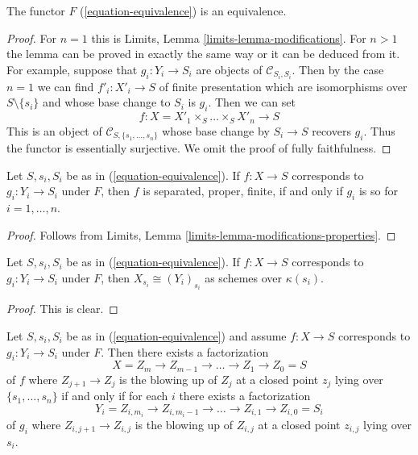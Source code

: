\begin{lemma}
\label{lemma-equivalence}
The functor $F$ (\ref{equation-equivalence}) is an equivalence.
\end{lemma}

\begin{proof}
For $n = 1$ this is Limits, Lemma \ref{limits-lemma-modifications}.
For $n > 1$ the lemma can be proved in exactly the same way or it
can be deduced from it. For example, suppose that
$g_i : Y_i \to S_i$ are objects of $\mathcal{C}_{S_i, S_i}$.
Then by the case $n = 1$ we can find $f'_i : X'_i \to S$
of finite presentation
which are isomorphisms over $S \setminus \{s_i\}$ and whose
base change to $S_i$ is $g_i$. Then we can set
$$
f : X = X'_1 \times_S \ldots \times_S X'_n \to S
$$
This is an object of $\mathcal{C}_{S, \{s_1, \ldots, s_n\}}$
whose base change by $S_i \to S$ recovers $g_i$. Thus the functor
is essentially surjective. We omit the proof of
fully faithfulness.
\end{proof}

\begin{lemma}
\label{lemma-equivalence-properties}
Let $S, s_i, S_i$ be as in (\ref{equation-equivalence}).
If $f : X \to S$ corresponds to $g_i : Y_i \to S_i$ under $F$,
then $f$ is separated, proper, finite, if and only if $g_i$ is so
for $i = 1, \ldots, n$.
\end{lemma}

\begin{proof}
Follows from Limits, Lemma
\ref{limits-lemma-modifications-properties}.
\end{proof}

\begin{lemma}
\label{lemma-equivalence-fibre}
Let $S, s_i, S_i$ be as in (\ref{equation-equivalence}).
If $f : X \to S$ corresponds to $g_i : Y_i \to S_i$ under $F$,
then $X_{s_i} \cong (Y_i)_{s_i}$ as schemes over $\kappa(s_i)$.
\end{lemma}

\begin{proof}
This is clear.
\end{proof}

\begin{lemma}
\label{lemma-equivalence-sequence-blowups}
Let $S, s_i, S_i$ be as in (\ref{equation-equivalence})
and assume $f : X \to S$ corresponds to $g_i : Y_i \to S_i$ under $F$.
Then there exists a factorization
$$
X = Z_m \to Z_{m - 1} \to \ldots \to Z_1 \to Z_0 = S
$$
of $f$ where $Z_{j + 1} \to Z_j$ is the blowing up of $Z_j$ at a closed
point $z_j$ lying over $\{s_1, \ldots, s_n\}$ if and only if for each
$i$ there exists a factorization
$$
Y_i = Z_{i, m_i} \to Z_{i, m_i - 1} \to \ldots \to Z_{i, 1} \to Z_{i, 0} = S_i
$$
of $g_i$ where $Z_{i, j + 1} \to Z_{i, j}$ is the blowing up of $Z_{i, j}$
at a closed point $z_{i, j}$ lying over $s_i$.
\end{lemma}

